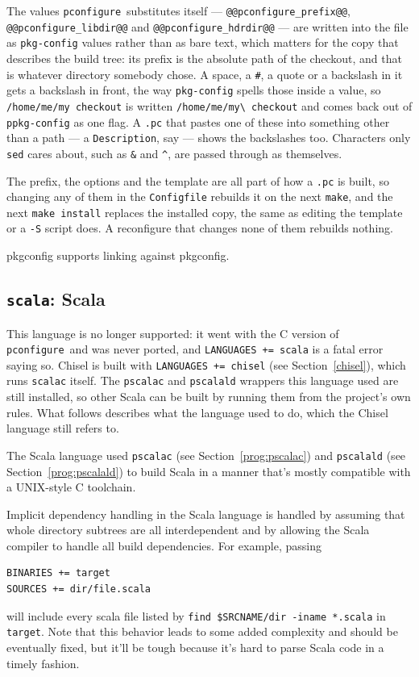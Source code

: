 \documentclass{article}
\newcommand{\pconfigure}{\texttt{pconfigure}}
\begin{document}
The values \pconfigure\ substitutes itself ---
\texttt{@@pconfigure\_prefix@@}, \texttt{@@pconfigure\_libdir@@} and
\texttt{@@pconfigure\_hdrdir@@} --- are written into the file as
\texttt{pkg-config} values rather than as bare text, which matters for
the copy that describes the build tree: its prefix is the absolute path
of the checkout, and that is whatever directory somebody chose.  A
space, a \texttt{\#}, a quote or a backslash in it gets a backslash in
front, the way \texttt{pkg-config} spells those inside a value, so
\texttt{/home/me/my checkout} is written
\texttt{/home/me/my\textbackslash\ checkout} and comes back out of
\texttt{ppkg-config} as one flag.  A \texttt{.pc} that pastes one of
these into something other than a path --- a \texttt{Description},
say --- shows the backslashes too.  Characters only \texttt{sed} cares
about, such as \texttt{\&} and \texttt{\^{}}, are passed through as
themselves.

The prefix, the options and the template are all part of how a
\texttt{.pc} is built, so changing any of them in the
\texttt{Configfile} rebuilds it on the next \texttt{make}, and the
next \texttt{make install} replaces the installed copy, the same as
editing the template or a \texttt{-S} script does.  A reconfigure
that changes none of them rebuilds nothing.

pkgconfig supports linking against pkgconfig.

\subsection{\texttt{scala}: Scala \label{lang:scala}}

This language is no longer supported: it went with the C version of
\pconfigure\ and was never ported, and \texttt{LANGUAGES += scala} is
a fatal error saying so.  Chisel is built with \texttt{LANGUAGES +=
chisel} (see Section~\ref{chisel}), which runs \texttt{scalac} itself.
The \texttt{pscalac} and \texttt{pscalald} wrappers this language used
are still installed, so other Scala can be built by running them from
the project's own rules.  What follows describes what the language
used to do, which the Chisel language still refers to.

The Scala language used \texttt{pscalac} (see
Section~\ref{prog:pscalac}) and \texttt{pscalald} (see
Section~\ref{prog:pscalald}) to build Scala in a manner that's mostly
compatible with a UNIX-style C toolchain.

Implicit dependency handling in the Scala language is handled by
assuming that whole directory subtrees are all interdependent and by
allowing the Scala compiler to handle all build dependencies.  For example, passing
\begin{verbatim}
BINARIES += target
SOURCES += dir/file.scala
\end{verbatim}
will include every scala file listed by \texttt{find \$SRCNAME/dir
  -iname *.scala} in \texttt{target}.  Note that this behavior leads
to some added complexity and should be eventually fixed, but it'll be
tough because it's hard to parse Scala code in a timely fashion.
\end{document}
